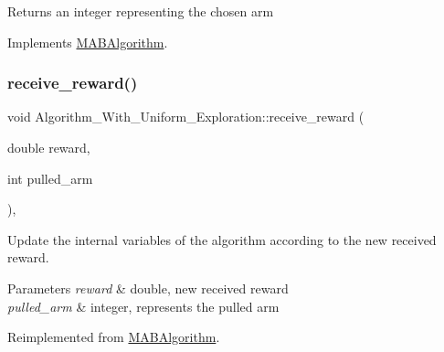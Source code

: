 \begin{DoxyReturn}{Returns}
an integer representing the chosen arm 
\end{DoxyReturn}


Implements \mbox{\hyperlink{class_m_a_b_algorithm_afb48f01df0e1860d19759f6e20335007}{M\+A\+B\+Algorithm}}.

\mbox{\label{class_algorithm___with___uniform___exploration_a946808f681cd7b54bd557e1d8f15c5d0}} 
\subsubsection{\texorpdfstring{receive\+\_\+reward()}{receive\_reward()}}
{\footnotesize\ttfamily void Algorithm\+\_\+\+With\+\_\+\+Uniform\+\_\+\+Exploration\+::receive\+\_\+reward (\begin{DoxyParamCaption}\item[{double}]{reward,  }\item[{int}]{pulled\+\_\+arm }\end{DoxyParamCaption})\hspace{0.3cm}{\ttfamily [override]}, {\ttfamily [virtual]}}



Update the internal variables of the algorithm according to the new received reward. 


\begin{DoxyParams}{Parameters}
{\em reward} & double, new received reward \\
\hline
{\em pulled\+\_\+arm} & integer, represents the pulled arm \\
\hline
\end{DoxyParams}


Reimplemented from \mbox{\hyperlink{class_m_a_b_algorithm_aa584b3d6b86fa050e3389be9781b5782}{M\+A\+B\+Algorithm}}.

\mbox{\label{class_algorithm___with___uniform___exploration_a96b0df2a59099ba8b4cc83f21b407642}} 
